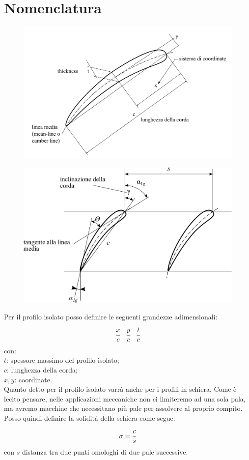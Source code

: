\section{Nomenclatura}
\begin{figure}[h!]
\centering
\begin{minipage}{.5\textwidth}
  \centering
  \includegraphics[width=.98\linewidth]{fig/profiloDef.pdf}
  \label{}
\end{minipage}%
\begin{minipage}{.5\textwidth}
  \centering
  \includegraphics[width=.98\linewidth]{fig/schiera_2.pdf}
  \label{}
\end{minipage}
\end{figure}
Per il profilo isolato posso definire le seguenti grandezze adimensionali:
\begin{align*}
\cfrac{x}{c} \;\;\; \cfrac{y}{c} \;\;\; \cfrac{t}{c}
\end{align*}
con:\\[1mm]
$t$: spessore massimo del profilo isolato;\\
$c$: lunghezza della corda;\\
$x,y$: coordinate.\\[2mm]
Quanto detto per il profilo isolato varrà anche per i profili in schiera. Come è lecito pensare, nelle applicazioni meccaniche non ci limiteremo ad una sola pala, ma avremo macchine che necessitano più pale per assolvere al proprio compito. Posso quindi definire la solidità della schiera come segue:
\begin{equation}
\sigma = \cfrac{c}{s}
\end{equation}
con $s$ distanza tra due punti omologhi di due pale successive.
